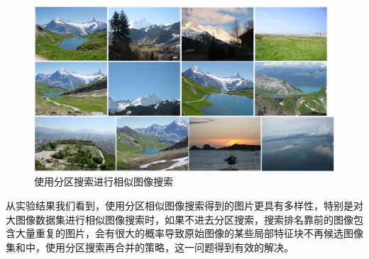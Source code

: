 \begin{figure}
\centering\includegraphics[width=15cm]{imgs/ch4/candidates2}
\caption{使用分区搜索进行相似图像搜索}
\label{fig:candidates2}
\end{figure}
从实验结果我们看到，使用分区相似图像搜索得到的图片更具有多样性，特别是对大图像数据集进行相似图像搜索时，如果不进去分区搜索，搜索排名靠前的图像包含大量重复的图片，会有很大的概率导致原始图像的某些局部特征块不再候选图像集和中，使用分区搜索再合并的策略，这一问题得到有效的解决。

\ifx\usechapbib\empty
\nocite{BSTcontrol}


\fi
